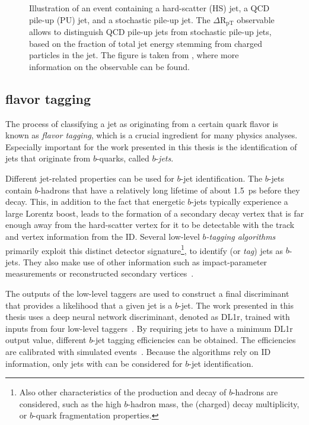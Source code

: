 \FloatBarrier
\begin{figure}[t]
    \caption{Illustration of an event containing a hard-scatter (HS) jet, a QCD pile-up (PU) jet, and a stochastic pile-up jet. The $\Delta \text{R}_{\text{pT}}$ observable allows to distinguish QCD pile-up jets from stochastic pile-up jets, based on the fraction of total jet energy stemming from charged particles in the jet. The figure is taken from , where more information on the observable can be found.}
    \label{fig:pile-up-jets-illustration}
\end{figure}


\subsection{flavor tagging}
\label{subsec:flavor-tagging}
The process of classifying a jet as originating from a certain quark flavor is known as \emph{flavor tagging}, which is a crucial ingredient for many physics analyses. Especially important for the work presented in this thesis is the identification of jets that originate from $b$-quarks, called $b$-\emph{jets}.

Different jet-related properties can be used for $b$-jet identification.
The $b$-jets contain $b$-hadrons that have a relatively long lifetime of about \SI{1.5}{\pico\second} before they decay. This, in addition to the fact that energetic $b$-jets typically experience a large Lorentz boost, leads to the formation of a secondary decay vertex that is far enough away from the hard-scatter vertex for it to be detectable with the track and vertex information from the ID.
Several low-level \emph{$b$-tagging algorithms} primarily exploit this distinct detector signature\footnote{Also other characteristics of the production and decay of $b$-hadrons are considered, such as the high $b$-hadron mass, the (charged) decay multiplicity, or $b$-quark fragmentation properties.}, to identify (or \emph{tag}) jets as $b$-jets. They also make use of other information such as impact-parameter measurements or reconstructed secondary vertices~\cite{ATL-PHYS-PUB-2017-013}.

The outputs of the low-level taggers are used to construct a final discriminant that provides a likelihood that a given jet is a $b$-jet. The work presented in this thesis uses a deep neural network discriminant, denoted as DL1r, trained with inputs from four low-level taggers~\cite{ATL-PHYS-PUB-2017-013}.
By requiring jets to have a minimum DL1r output value, different $b$-jet tagging efficiencies can be obtained. The efficiencies are calibrated with simulated \ttbar events~\cite{FTAG-2018-01}.
Because the algorithms rely on ID information, only jets with  can be considered for $b$-jet identification.



